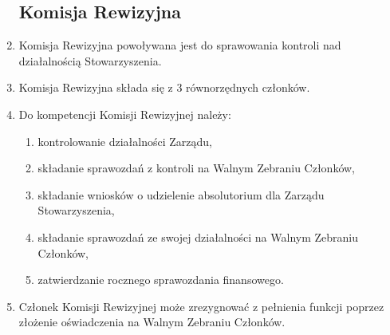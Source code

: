 \documentclass{article}
\begin{document}
\begin{enumerate}
    \subsection{Komisja Rewizyjna}
	    \item Komisja Rewizyjna powoływana jest do sprawowania kontroli nad działalnością Stowarzyszenia.
	    \item Komisja Rewizyjna składa się z 3 równorzędnych członków.
	    \item Do kompetencji Komisji Rewizyjnej należy:
	      \begin{enumerate}
	        \item kontrolowanie działalności Zarządu,
	        \item składanie sprawozdań z kontroli na Walnym Zebraniu Członków,
	        \item składanie wniosków o udzielenie absolutorium dla Zarządu Stowarzyszenia,
	        \item składanie sprawozdań ze swojej działalności na Walnym Zebraniu Członków,
	        \item zatwierdzanie rocznego sprawozdania finansowego.
	      \end{enumerate}
	    \item Członek Komisji Rewizyjnej może zrezygnować z pełnienia funkcji poprzez złożenie oświadczenia na Walnym Zebraniu Członków.
	  \end{enumerate}
\end{document}
